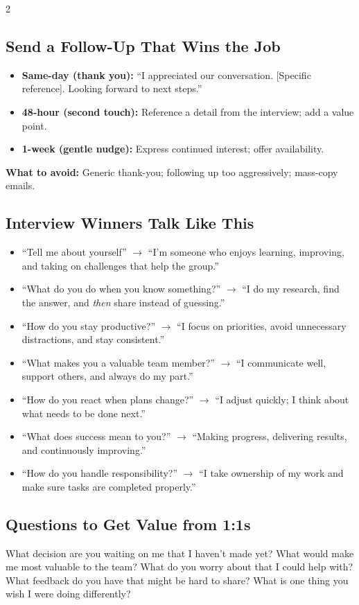 \documentclass[10pt,a4paper]{article}
\begin{document}
\begin{multicols}{2}
\subsection{Send a Follow-Up That Wins the Job}
\begin{itemize}
\item \textbf{Same-day (thank you):} ``I appreciated our conversation. [Specific reference]. Looking forward to next steps.''
\item \textbf{48-hour (second touch):} Reference a detail from the interview; add a value point.
\item \textbf{1-week (gentle nudge):} Express continued interest; offer availability.
\end{itemize}
\textbf{What to avoid:} Generic thank-you; following up too aggressively; mass-copy emails.

\subsection{Interview Winners Talk Like This}
\begin{itemize}
\item ``Tell me about yourself'' $\to$ ``I'm someone who enjoys learning, improving, and taking on challenges that help the group.''
\item ``What do you do when you know something?'' $\to$ ``I do my research, find the answer, and \emph{then} share instead of guessing.''
\item ``How do you stay productive?'' $\to$ ``I focus on priorities, avoid unnecessary distractions, and stay consistent.''
\item ``What makes you a valuable team member?'' $\to$ ``I communicate well, support others, and always do my part.''
\item ``How do you react when plans change?'' $\to$ ``I adjust quickly; I think about what needs to be done next.''
\item ``What does success mean to you?'' $\to$ ``Making progress, delivering results, and continuously improving.''
\item ``How do you handle responsibility?'' $\to$ ``I take ownership of my work and make sure tasks are completed properly.''
\end{itemize}

\subsection{Questions to Get Value from 1:1s}
What decision are you waiting on me that I haven't made yet? What would make me most valuable to the team? What do you worry about that I could help with? What feedback do you have that might be hard to share? What is one thing you wish I were doing differently?


\end{multicols}
\end{document}
